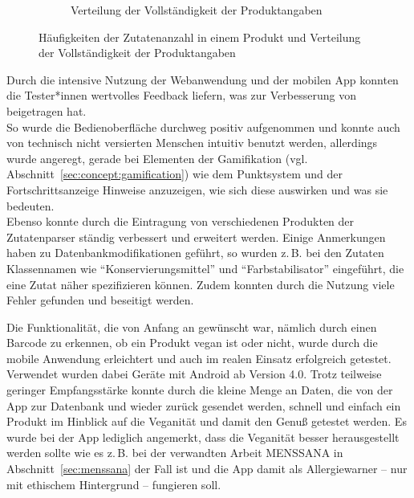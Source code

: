 \begin{figure}[ht]
\begin{adjustwidth}{-1in}{-1in}
\begin{subfigure}[b]{0.6\textwidth}
		\caption{Verteilung der Vollständigkeit der Produktangaben}
		\label{img:integrity-2}
	\end{subfigure}
	\end{adjustwidth}
	\caption{Häufigkeiten der Zutatenanzahl in einem Produkt und Verteilung 
der Vollständigkeit der Produktangaben}
	\label{img:evaluation-2}
\end{figure}

Durch die intensive Nutzung der 
Webanwendung und der mobilen App konnten die Tester*innen wertvolles Feedback 
liefern, was zur Verbesserung von \name beigetragen hat.\\
So wurde die Bedienoberfläche durchweg positiv aufgenommen und konnte auch 
von technisch nicht versierten Menschen intuitiv benutzt werden, allerdings 
wurde angeregt, gerade bei Elementen der Gamifikation (vgl. 
Abschnitt~\ref{sec:concept:gamification}) wie dem Punktsystem und der 
Fortschrittsanzeige Hinweise anzuzeigen, wie sich diese auswirken und was sie 
bedeuten.\\
Ebenso konnte
durch die Eintragung von verschiedenen Produkten der
Zutatenparser ständig verbessert und erweitert werden.
Einige Anmerkungen haben zu Datenbankmodifikationen geführt, so 
wurden z.\,B. bei den Zutaten Klassennamen wie "`Konservierungsmittel"' und 
"`Farbstabilisator"' eingeführt, die eine Zutat näher spezifizieren können.
Zudem konnten durch die Nutzung viele Fehler gefunden und beseitigt werden.

Die Funktionalität, die von Anfang an gewünscht war, nämlich durch einen 
Barcode zu erkennen, ob ein Produkt vegan ist oder nicht, wurde durch die 
mobile Anwendung erleichtert und auch im realen Einsatz erfolgreich 
getestet. Verwendet wurden dabei Geräte mit Android ab Version 4.0.
Trotz teilweise geringer Empfangsstärke konnte durch die kleine Menge an Daten, 
die von der App zur Datenbank und wieder zurück gesendet werden, schnell und 
einfach ein Produkt im Hinblick auf die Veganität und damit den Genuß getestet 
werden.
Es wurde bei der App lediglich angemerkt, dass die Veganität besser 
herausgestellt werden sollte wie es z.\,B. bei der verwandten Arbeit 
\ac{MENSSANA} in Abschnitt~\ref{sec:menssana} der Fall ist und die App damit 
als Allergiewarner -- nur mit ethischem Hintergrund -- fungieren soll.